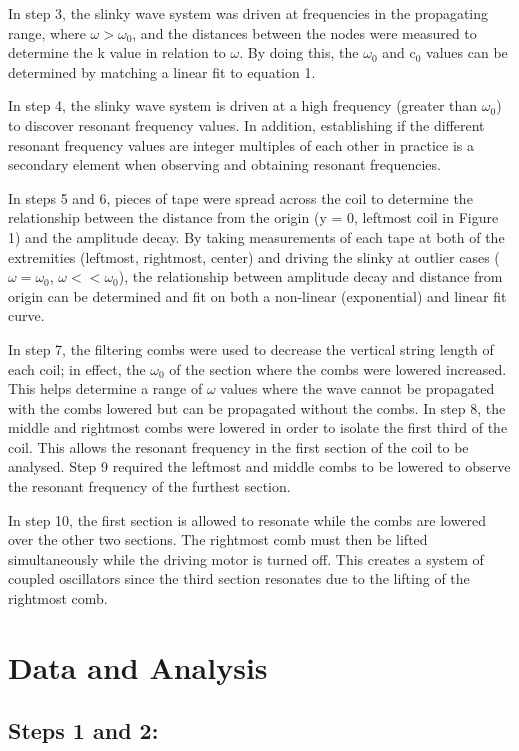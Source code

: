 \documentclass[12pt, letterpaper, twoside]{article}
\begin{document}
In step 3, the slinky wave system was driven at frequencies in the propagating range, where $\omega > \omega_0$, and the distances between the nodes were measured to determine the k value in relation to $\omega$. By doing this, the $\omega_0$ and c$_0$ values can be determined by matching a linear fit to equation 1.

In step 4, the slinky wave system is driven at a high frequency (greater than $\omega_0$) to discover resonant frequency values. In addition, establishing if the different resonant frequency values are integer multiples of each other in practice is a secondary element when observing and obtaining resonant frequencies.

In steps 5 and 6, pieces of tape were spread across the coil to determine the relationship between the distance from the origin (y = 0, leftmost coil in Figure 1) and the amplitude decay. By taking measurements of each tape at both of the extremities (leftmost, rightmost, center) and driving the slinky at outlier cases ($\omega = \omega_0$, $\omega << \omega_0$), the relationship between amplitude decay and distance from origin can be determined and fit on both a non-linear (exponential) and linear fit curve.

In step 7,  the filtering combs were used to decrease the vertical string length of each coil; in effect, the $\omega_0$ of the section where the combs were lowered increased. This helps determine a range of $\omega$ values where the wave cannot be propagated with the combs lowered but can be propagated without the combs. In step 8, the middle and rightmost combs were lowered in order to isolate the first third of the coil. This allows the resonant frequency in the first section of the coil to be analysed. Step 9 required the leftmost and middle combs to be lowered to observe the resonant frequency of the furthest section.

In step 10, the first section is allowed to resonate while the combs are lowered over the other two sections. The rightmost comb must then be lifted simultaneously while the driving motor is turned off. This creates a system of coupled oscillators since the third section resonates due to the lifting of the rightmost comb.

\section{Data and Analysis}
\subsection{Steps 1 and 2:}
\end{document}
